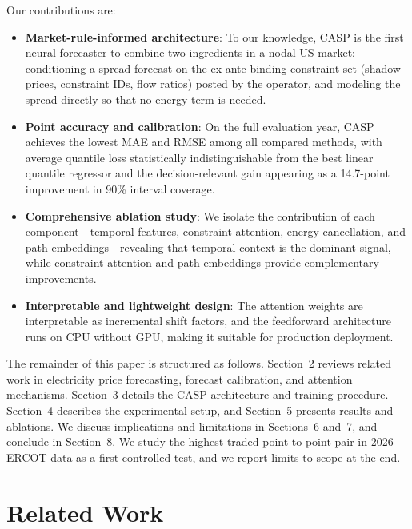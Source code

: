 \documentclass{article}
\begin{document}
Our contributions are:
\begin{itemize}
  \item \textbf{Market-rule-informed architecture}: To our knowledge, CASP is the first neural forecaster to combine two ingredients in a nodal US market: conditioning a spread forecast on the ex-ante binding-constraint set (shadow prices, constraint IDs, flow ratios) posted by the operator, and modeling the spread directly so that no energy term is needed.
  \item \textbf{Point accuracy and calibration}: On the full evaluation year, CASP achieves the lowest MAE and RMSE among all compared methods, with average quantile loss statistically indistinguishable from the best linear quantile regressor and the decision-relevant gain appearing as a 14.7-point improvement in 90\% interval coverage.
  \item \textbf{Comprehensive ablation study}: We isolate the contribution of each component---temporal features, constraint attention, energy cancellation, and path embeddings---revealing that temporal context is the dominant signal, while constraint-attention and path embeddings provide complementary improvements.
  \item \textbf{Interpretable and lightweight design}: The attention weights are interpretable as incremental shift factors, and the feedforward architecture runs on CPU without GPU, making it suitable for production deployment.
\end{itemize}

The remainder of this paper is structured as follows. Section~2 reviews related work in electricity price forecasting, forecast calibration, and attention mechanisms. Section~3 details the CASP architecture and training procedure. Section~4 describes the experimental setup, and Section~5 presents results and ablations. We discuss implications and limitations in Sections~6 and~7, and conclude in Section~8. We study the highest traded point-to-point pair in 2026 ERCOT data as a first controlled test, and we report limits to scope at the end.

\section{Related Work}
\label{sec:related_work}
\end{document}
